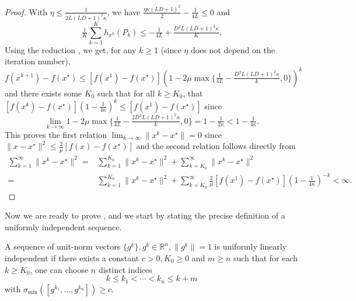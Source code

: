 \begin{proof}
With $\eta \leq \frac{1}{2 L (L D + 1)^2 \kappa}$, we have $\tfrac{\eta \kappa
(L D + 1)^2}{2} - \tfrac{1}{4 L} \leq 0$ and
\[ \textstyle \tfrac{1}{K} \sum_{k = 1}^K h_{x^k} (P_k) \leq - \tfrac{1}{4 L} +
   \tfrac{D^2 L (L D + 1)^2 \kappa}{K} . \]
Using the reduction , we get, for any $k \geq 1$ (since $\eta$ does not depend
on the iteration number),
\[ f (x^{k + 1}) - f (x^{\star}) \leq [f (x^1) - f (x^{\star})] ( 1 - 2
   \mu \max \{ \tfrac{1}{4 L} - \tfrac{D^2 L (L D + 1)^2 \kappa}{k}, 0
   \} )^k \]
and there exists some $K_0$ such that for all $k \geq K_0$, that $[f (x^k) - f (x^{\star})] ( 1 -
\tfrac{1}{4 \kappa} )^k \leq  [f (x^1) - f (x^{\star})]$ since
\[ \lim_{k \rightarrow \infty} 1 - 2 \mu \max \{ \tfrac{1}{4 L} -
   \tfrac{2 D^2 L (L D + 1)^2 \kappa}{k}, 0 \} = 1 - \tfrac{1}{2 \kappa}
   < 1 - \tfrac{1}{4 \kappa} . \]
   This proves the first relation $\lim_{k \rightarrow \infty} \| x^k - x^{\star} \| = 0$ since $\|x - x^\star\|^2 \leq \frac{2}{\mu} [f(x) - f(x^\star)] $ and the second relation follows directly from    
\begin{align}
\textstyle \sum_{k=1}^\infty \|x^k - x^\star\|^2 ={} & \textstyle\sum_{k=1}^{K_0} \|x^k - x^\star\|^2 + \sum_{k=K_0}^{\infty} \|x^k - x^\star\|^2 \\
 ={} & \textstyle\sum_{k=1}^{K_0} \|x^k - x^\star\|^2 + \sum_{k=K_0}^{\infty} \frac{2}{\mu}[f(x^1)-f(x^\star)](1-\frac{1}{4\kappa})^{-k} < \infty.
\end{align}
\end{proof}


Now we are ready to prove , and we start by stating the precise definition of a uniformly independent sequence.

\begin{definition}
  A sequence of unit-norm vectors $\{ g^k \}, g^k \in \mathbb{R}^n, \| g^k \|
  = 1$ is uniformly linearly independent if there exists a constant $c > 0, K_0 \geq 0$ and $m \geq n$ such that for each $k \geq K_0$, one can
  choose $n$ distinct indices
  \[ k \leq k_1 < \cdots < k_n \leq k + m \]
  with $\sigma_{\min} ([g^{k_1}, \ldots, g^{k_n}]) \geq c$.
\end{definition}

